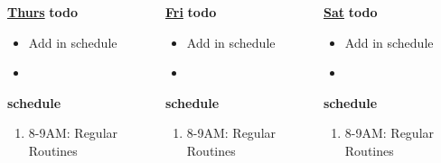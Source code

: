 \begin{columns}
          \begin{column}{0.14\textwidth}{\small \underline{\bf Thurs}}
            {\small {\bf todo}} \\ 
            \begin{itemize}
              \tiny \item \tiny Add in schedule
            \item \tiny 
            \end{itemize} 
                {\small {\bf schedule}} \\
                \begin{enumerate} 
                  \tiny \item \tiny 8-9AM: Regular Routines 
                \end{enumerate}
          \end{column} 
          
          \begin{column}{0.14\textwidth}{\small \underline{\bf Fri}}
            {\small {\bf todo}} \\ 
            \begin{itemize}
              \tiny \item \tiny Add in schedule
            \item \tiny 
            \end{itemize} 
                {\small {\bf schedule}} \\
                \begin{enumerate} 
                  \tiny \item \tiny 8-9AM: Regular Routines 
                \end{enumerate}
          \end{column}

          \begin{column}{0.15\textwidth}{\small \underline{\bf Sat}}
            { \small {\bf todo}} \\ 
            \begin{itemize}
              \tiny \item \tiny Add in schedule
            \item \tiny 
            \end{itemize} 
                {\small {\bf schedule}} \\
                \begin{enumerate} 
                  \tiny \item \tiny 8-9AM: Regular Routines 
                \end{enumerate}
          \end{column}
          

\end{columns}
